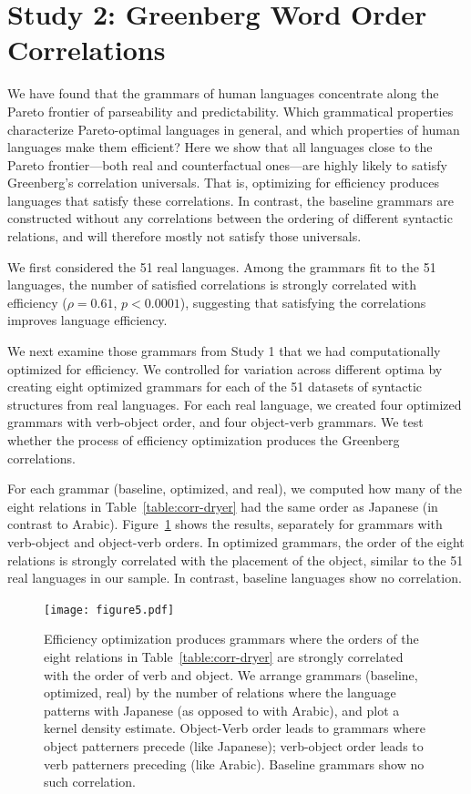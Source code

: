 \documentclass[9pt,twocolumn,twoside,lineno]{pnas-new}
\begin{document}
\section*{Study 2: Greenberg Word Order Correlations}
\label{sec:greenberg}

We have found that the grammars of human languages concentrate along the Pareto frontier of parseability and predictability.
Which grammatical properties characterize Pareto-optimal languages in general, and which properties of human languages make them efficient?
Here we show that all languages close to the Pareto frontier---both real and counterfactual ones---are highly likely to satisfy Greenberg's correlation universals.
That is, optimizing for efficiency produces languages that satisfy these correlations.
In contrast, the baseline grammars are constructed without any correlations between the ordering of different syntactic relations, and will therefore mostly not satisfy those universals.

We first considered the 51 real languages.
Among the grammars fit to the 51 languages, the number of satisfied correlations is strongly correlated with efficiency ($\rho = 0.61$, $p<0.0001$), suggesting that satisfying the correlations improves language efficiency.


We next examine those grammars from Study 1 that we had computationally optimized for efficiency.
We controlled for variation across different optima by creating eight optimized grammars for each of the 51 datasets of syntactic structures from real languages.
For each real language, we created four optimized grammars with verb-object order, and four object-verb grammars.
We test whether the process of efficiency optimization produces the Greenberg correlations.


For each grammar (baseline, optimized, and real), we computed how many of the eight relations in Table~\ref{table:corr-dryer} had the same order as  Japanese (in contrast to Arabic).
Figure~\ref{fig:joint} shows the results, separately for grammars with verb-object and object-verb orders.
In optimized grammars, the order of the eight relations is strongly correlated with the placement of the object, similar to the 51 real languages in our sample.
In contrast, baseline languages show no correlation.


\begin{figure}
    \centering
    \texttt{[image: figure5.pdf]}
    \caption{
    Efficiency optimization produces grammars where the orders of the eight relations in Table~\ref{table:corr-dryer} are strongly correlated with the order of verb and object. We arrange grammars (baseline, optimized, real) by the number of relations where the language patterns with Japanese (as opposed to with Arabic), and plot a kernel density estimate. Object-Verb order leads to grammars where object patterners precede (like Japanese); verb-object order leads to verb patterners preceding (like Arabic). Baseline grammars show no such correlation.
    }
    \label{fig:joint}
\end{figure}
\end{document}
